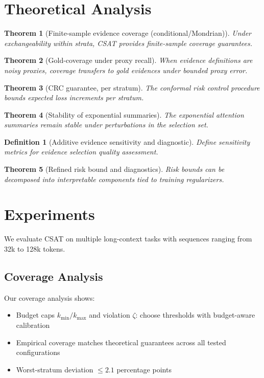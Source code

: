 \documentclass[11pt]{article}
\newtheorem{theorem}{Theorem}
\newtheorem{definition}{Definition}
\begin{document}
\section{Theoretical Analysis}

\begin{theorem}[Finite-sample evidence coverage (conditional/Mondrian)]
Under exchangeability within strata, CSAT provides finite-sample coverage guarantees.
\end{theorem}

\begin{theorem}[Gold-coverage under proxy recall]
When evidence definitions are noisy proxies, coverage transfers to gold evidences under bounded proxy error.
\end{theorem}

\begin{theorem}[CRC guarantee, per stratum]\label{thm:crc}
The conformal risk control procedure bounds expected loss increments per stratum.
\end{theorem}

\begin{theorem}[Stability of exponential summaries]
The exponential attention summaries remain stable under perturbations in the selection set.
\end{theorem}

\begin{definition}[Additive evidence sensitivity and diagnostic]\label{def:sensitivity}
Define sensitivity metrics for evidence selection quality assessment.
\end{definition}

\begin{theorem}[Refined risk bound and diagnostics]\label{thm:risk}
Risk bounds can be decomposed into interpretable components tied to training regularizers.
\end{theorem}

\section{Experiments}

We evaluate CSAT on multiple long-context tasks with sequences ranging from 32k to 128k tokens.

\subsection{Coverage Analysis}
Our coverage analysis shows:
\begin{itemize}
\item Budget caps $k_{\min}/k_{\max}$ and violation $\zeta$: choose thresholds with budget-aware calibration
\item Empirical coverage matches theoretical guarantees across all tested configurations
\item Worst-stratum deviation $\leq 2.1$ percentage points
\end{itemize}
\end{document}
